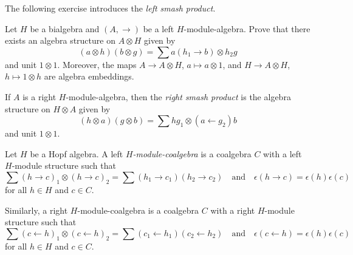 \documentclass[12pt]{amsproc}
\begin{document}

The following exercise introduces the 
\emph{left smash product}. 

\begin{exercise}
\label{xca:left_smash}
Let $H$ be a bialgebra and $(A,\rightarrow)$ be a left $H$-module-algebra.
Prove that there exists an algebra structure on $A\otimes H$ given by
\[
(a\otimes h)(b\otimes g)=\sum a(h_{1}\rightarrow b)\otimes h_{2}g
\]
and unit $1\otimes1$. Moreover, 
the maps $A\to A\otimes H$, $a\mapsto a\otimes1$,
and $H\to A\otimes H$, $h\mapsto 1\otimes h$ 
are algebra embeddings.
\end{exercise}

If $A$ is a right $H$-module-algebra, then 
the \emph{right smash product} is the algebra structure 
on $H\otimes A$ given by 
\[
(h\otimes a)(g\otimes b)=\sum hg_{1}\otimes(a\leftarrow g_{2})b
\]
and unit $1\otimes1$.



\begin{definition}
\label{def:module_coalgebra}
Let $H$ be a Hopf algebra. A left \emph{$H$-module-coalgebra}
is a coalgebra $C$ with a left $H$-module structure such that 
\[
\sum (h\rightarrow c)_{1}\otimes(h\rightarrow c)_{2} =\sum (h_{1}\rightarrow c_{1})(h_{2}\rightarrow c_{2})
\quad\text{and}\quad 
\epsilon(h\rightarrow c)  =\epsilon(h)\epsilon(c)
\]
for all $h\in H$ and $c\in C$. 
\end{definition}

Similarly, a right $H$-module-coalgebra 
is a coalgebra $C$ with a right
$H$-module structure such that 
\[
\sum (c\leftarrow h)_{1}\otimes(c\leftarrow h)_{2} =\sum (c_{1}\leftarrow h_{1})(c_{2}\leftarrow h_{2})
\quad\text{and}\quad 
\epsilon(c\leftarrow h)  =\epsilon(h)\epsilon(c)
\]
for all $h\in H$ and $c\in C$.
\end{document}
